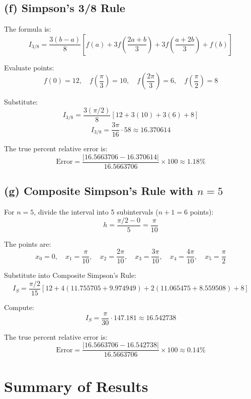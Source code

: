 \documentclass[11pt]{article}
\begin{document}
\subsection*{(f) Simpson's 3/8 Rule}
The formula is:
\[
I_{3/8} = \frac{3(b-a)}{8}\left[f(a) + 3f\left(\frac{2a+b}{3}\right) + 3f\left(\frac{a+2b}{3}\right) + f(b)\right]
\]

Evaluate points:
\[
f(0) = 12, \quad f\left(\frac{\pi}{3}\right) = 10, \quad f\left(\frac{2\pi}{3}\right) = 6, \quad f\left(\frac{\pi}{2}\right) = 8
\]

Substitute:
\[
I_{3/8} = \frac{3(\pi/2)}{8}\left[12 + 3(10) + 3(6) + 8\right]
\]
\[
I_{3/8} = \frac{3\pi}{16}\cdot 58 \approx 16.370614
\]

The true percent relative error is:
\[
\text{Error} = \frac{|16.5663706 - 16.370614|}{16.5663706} \times 100 \approx 1.18\%
\]



\subsection*{(g) Composite Simpson's Rule with \(n = 5\)}
For \(n = 5\), divide the interval into 5 subintervals (\(n+1 = 6\) points):
\[
h = \frac{\pi/2 - 0}{5} = \frac{\pi}{10}
\]

The points are:
\[
x_0 = 0, \quad x_1 = \frac{\pi}{10}, \quad x_2 = \frac{2\pi}{10}, \quad x_3 = \frac{3\pi}{10}, \quad x_4 = \frac{4\pi}{10}, \quad x_5 = \frac{\pi}{2}
\]

Substitute into Composite Simpson's Rule:
\[
I_S = \frac{\pi/2}{15} \left[12 + 4(11.755705 + 9.974949) + 2(11.065475 + 8.559508) + 8\right]
\]

Compute:
\[
I_S = \frac{\pi}{30} \cdot 147.181 \approx 16.542738
\]

The true percent relative error is:
\[
\text{Error} = \frac{|16.5663706 - 16.542738|}{16.5663706} \times 100 \approx 0.14\%
\]



\section*{Summary of Results}
\end{document}
